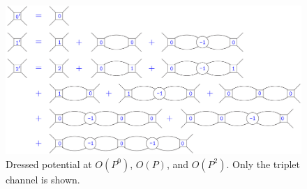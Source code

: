 \documentclass[prl,
twocolumn,
showpacs,preprintnumbers,amsmath,amssymb,
superscriptaddress,
a4paper,nofootinbib,longbibliography]{revtex4-2}
\begin{document}
\begin{figure}[htb]
    \centering
    \includegraphics[width=\textwidth]{figs/V_Dressed.pdf}
    \caption{Dressed potential at $O(P^0)$, $O(P)$, and $O(P^2)$. Only the triplet channel is shown.}
    \label{fig:V_Dressed}
\end{figure}
\end{document}
